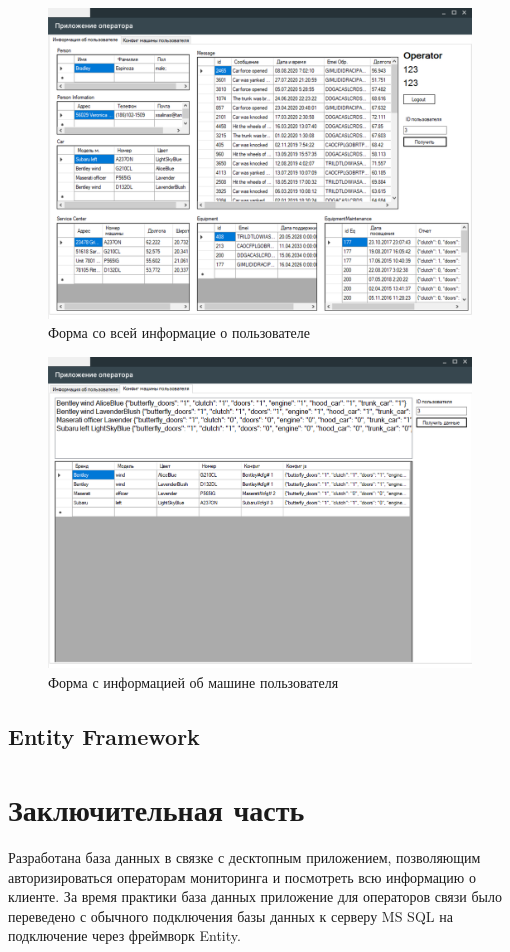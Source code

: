 \begin{figure}[H]
	\centering
	\includegraphics[scale=0.5]{img/main_1.png}
	\caption{Форма со всей информацие о пользователе}
	\label{img:main_1}
\end{figure}

\begin{figure}[H]
	\centering
	\includegraphics[scale=0.5]{img/main_2.png}
	\caption{Форма с информацией об машине пользователя}
	\label{img:main_2}
\end{figure}

\subsection{Entity Framework}


\newpage
\section{Заключительная часть}

\vspace{0.5cm}
\hspace{0.6cm}
Разработана база данных в связке с десктопным приложением, позволяющим авторизироваться операторам мониторинга и посмотреть всю информацию о клиенте. За время практики база данных приложение для операторов связи было переведено с обычного подключения базы данных к серверу MS SQL на подключение через фреймворк Entity.
